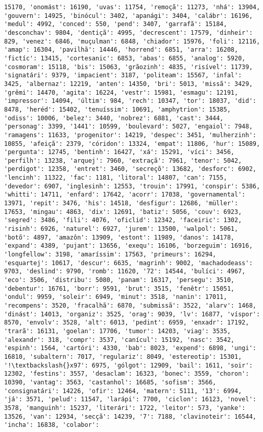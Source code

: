 \begin{Verbatim}[commandchars=\\\{\}]
15170, 'onomást': 16190, 'uvas': 11754, 'remoçã': 11273, 'nhá': 13904, 'gouvern': 14925, 'binócul': 3402, 'apanági': 3404, 'calábr': 16196, 'medul': 4992, 'conced': 550, 'pend': 3407, 'garrafã': 15184, 'desconchav': 9804, 'dentiçã': 4995, 'decrescent': 17579, 'dinheir': 829, 'venez': 6846, 'muçulman': 6848, 'chiador': 15976, 'foli': 12116, 'amap': 16304, 'pavilhã': 14446, 'horrend': 6851, 'arra': 16208, 'fictíc': 13415, 'cortesanic': 6853, 'abas': 6855, 'analog': 5920, 'cosmoram': 15118, 'bis': 15063, 'grãozinh': 4835, 'risível': 11739, 'signatári': 9379, 'impacient': 3187, 'politeam': 15567, 'infal': 3425, 'albernaz': 12219, 'anten': 14350, 'bri': 5013, 'missã': 3429, 'grêmi': 14470, 'agita': 16224, 'vestr': 15981, 'esmagu': 12191, 'impressor': 14094, 'últim': 984, 'rech': 10347, 'tor': 18037, 'did': 8478, 'heréd': 15402, 'tenuíssim': 10691, 'amphytrion': 15385, 'odiss': 10006, 'belez': 3440, 'nobrez': 6881, 'cast': 3444, 'personag': 3399, '1441': 10599, 'boulevard': 5027, 'engaiol': 7948, 'ramagens': 11633, 'progenitor': 14219, 'despec': 3451, 'mulherzinh': 10855, 'afeiçã': 2379, 'córidon': 13324, 'empat': 11806, 'hur': 15089, 'pergunta': 12745, 'bentinh': 16427, 'xá': 15291, 'víci': 3456, 'perfilh': 13238, 'arquej': 7960, 'extraçã': 7961, 'tenor': 5042, 'perdigot': 12358, 'entret': 3460, 'secreçõ': 13682, 'desforc': 6902, 'lencinh': 11322, 'fac': 1181, 'litoral': 14807, 'can': 7155, 'devedor': 6907, 'inglesinh': 12553, 'trouin': 17991, 'conspir': 5386, 'whitti': 14711, 'enfard': 17642, 'acorr': 17038, 'governamental': 13971, 'repit': 3476, 'his': 14518, 'desfigur': 12686, 'müller': 17653, 'mingau': 4863, 'dix': 12691, 'batiz': 5056, 'couv': 6923, 'segred': 3486, 'fili': 4076, 'oficlid': 12342, 'faceiric': 1302, 'risinh': 6926, 'naturel': 6927, 'jurem': 13500, 'walpol': 5061, 'botõ': 4897, 'amazôn': 13909, 'estont': 11989, 'danos': 14178, 'expand': 4389, 'pujant': 13656, 'exequ': 16106, 'borzeguim': 16916, 'longfellow': 3198, 'amaríssim': 17563, 'primeurs': 16294, 'esquartej': 10617, 'descur': 6635, 'magrinh': 9002, 'machadodeass': 9703, 'deslind': 9790, 'romb': 11620, '72': 14544, 'bulíci': 4967, 'eco': 3506, 'distribu': 5080, 'panam': 16317, 'persegu': 3510, 'debentur': 16761, 'borr': 9591, 'brut': 3515, 'fenêtr': 15051, 'ondul': 9959, 'soleir': 6949, 'minut': 3518, 'nanin': 17011, 'recompens': 3520, 'fracalhã': 6870, 'submissã': 3522, 'alarv': 1468, 'dinást': 14013, 'organiz': 3525, 'orag': 9039, 'lv': 16877, 'víspor': 8570, 'envolv': 3528, 'alt': 6013, 'pedint': 6959, 'enxadr': 17192, 'trarã': 16131, 'goelan': 17706, 'tumor': 14203, 'viag': 3535, 'alexandr': 318, 'compr': 3537, 'canícul': 15192, 'nasc': 3542, 'espinh': 1564, 'cartóri': 4330, 'bab': 8023, 'expend': 6898, 'ungi': 16810, 'subaltern': 7017, 'regulariz': 8049, 'estereotip': 15301, '!\textbackslash{}x97': 6975, 'gólgot': 12909, 'bail': 1611, 'soir': 12302, 'festins': 3557, 'desaclam': 16323, 'bonec': 3559, 'choron': 10390, 'vantag': 3563, 'castanhol': 16685, 'sofism': 3566, 'consignatári': 14226, 'ofir': 12464, 'matern': 5111, '13': 6994, 'já': 3571, 'pelud': 11547, 'larápi': 7700, 'ciclon': 16123, 'novel': 3578, 'manguinh': 15237, 'literári': 1722, 'leitor': 573, 'yanke': 13526, 'van': 12934, 'secçã': 14239, '7': 7188, 'clavinoteir': 16544, 'incha': 16838, 'colabor': 
\end{Verbatim}

